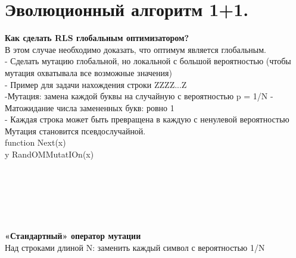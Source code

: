 \newcommand\tab[1][1cm]{\hspace*{#1}}
\section{Эволюционный алгоритм 1+1.}

\textbf{Как сделать RLS глобальным оптимизатором?}\\
В этом случае необходимо доказать, что оптимум является глобальным. \\
- Сделать мутацию глобальной, но локальной с большой вероятностью (чтобы мутация охватывала все возможные значения)\\
- Пример для задачи нахождения строки ZZZZ...Z \\
-Мутация: замена каждой буквы на случайную с вероятностью p = 1/N - Матожидание числа замененных букв: ровно 1 \\
- Каждая строка может быть превращена в каждую с ненулевой вероятностью \\
Мутация становится псевдослучайной.\\
function Next(x)  \\
y \leftarrow RandOMMutatIOn(x)  \\
\tab {} \\ 
\tab \tab {} \\
\tab {} \\
\tab {}  \\
 \\
\\
\textbf{«Стандартный» оператор мутации}\\
Над строками длиной N: заменить каждый символ с вероятностью 1/N \\

